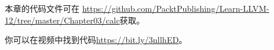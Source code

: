 本章的代码文件可在 \url{https://github.com/PacktPublishing/Learn-LLVM-12/tree/master/Chapter03/calc}获取。\par

你可以在视频中找到代码\url{https://bit.ly/3nllhED}。\par